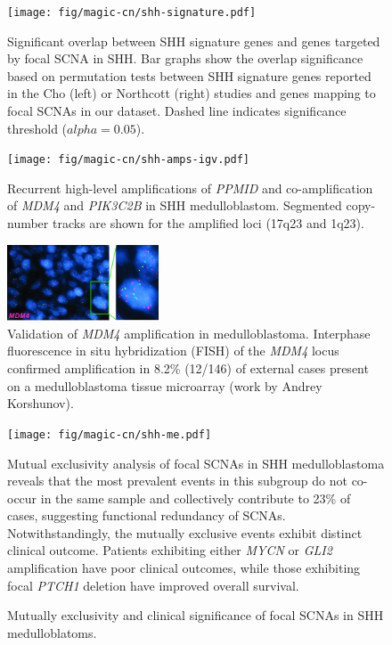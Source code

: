 \documentclass[11pt,letterpaper]{article}
\theoremstyle{definition}
\begin{document}
\clearpage

\begin{figure}
	\centering
	\texttt{[image: fig/magic-cn/shh-signature.pdf]}
	\caption{Significant overlap between SHH signature genes and genes targeted by focal SCNA in SHH.
		Bar graphs show the overlap significance based on permutation tests between SHH signature genes reported in the Cho (left) or Northcott (right) studies and genes mapping to focal SCNAs in our dataset. Dashed line indicates significance threshold ($alpha = 0.05$).}
	\label{fig:shh-signature}
\end{figure}

\begin{figure}
	\centering
	\texttt{[image: fig/magic-cn/shh-amps-igv.pdf]}
	\caption{Recurrent high-level amplifications of \emph{PPMID} and co-amplification of \emph{MDM4} and \emph{PIK3C2B} in SHH medulloblastom.
	Segmented copy-number tracks are shown for the amplified loci (17q23 and 1q23).}
	\label{fig:shh-amps-igv}
\end{figure}

\begin{figure}
	\centering
	\includegraphics[width=0.4\textwidth]{fig/magic-cn/mdm4-fish.jpg}
	\caption{Validation of \emph{MDM4} amplification in medulloblastoma.
	Interphase fluorescence in situ hybridization (FISH) of the \emph{MDM4} locus confirmed amplification in 8.2\% (12/146) of external cases present on a medulloblastoma tissue microarray (work by Andrey Korshunov).}
	\label{fig:mdm4-fish}
\end{figure}

\clearpage

\begin{figure}[h]
	\begin{center}
		\texttt{[image: fig/magic-cn/shh-me.pdf]}
	\end{center}
	\caption{Mutually exclusivity and clinical significance of focal SCNAs in SHH medulloblatoms.}
	Mutual exclusivity analysis of focal SCNAs in SHH medulloblastoma reveals that the most prevalent events in this subgroup do not co-occur in the same sample and collectively contribute to 23\% of cases, suggesting functional redundancy of SCNAs. Notwithstandingly, the mutually exclusive events exhibit distinct clinical outcome. Patients exhibiting either \emph{MYCN} or \emph{GLI2} amplification have poor clinical outcomes, while those exhibiting focal \emph{PTCH1} deletion have improved overall survival.
	\label{fig:shh-me}
\end{figure}
\end{document}
